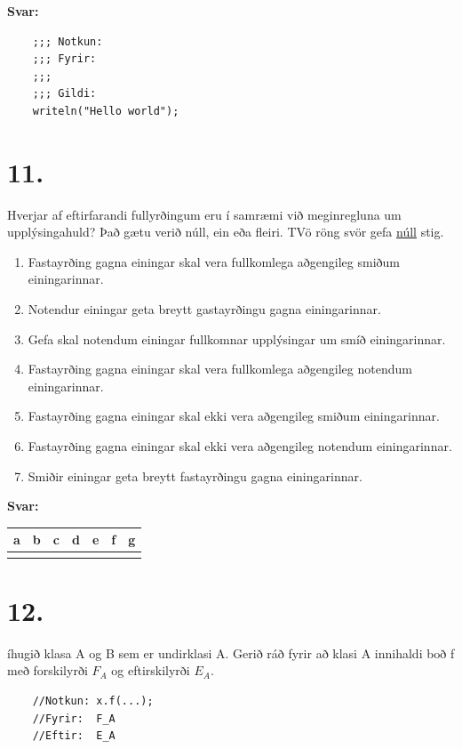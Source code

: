 \documentclass{article}
\newcommand{\sv}{\textbf{Svar:}}
\newcommand{\enum}{\begin{enumerate}[label = \alph*.]}
\begin{document}
     \sv





    \begin{lstlisting}
    ;;; Notkun:
    ;;; Fyrir:
    ;;;
    ;;; Gildi:
    writeln("Hello world");  
    \end{lstlisting}


    \newpage
    \section{11.}
    Hverjar af eftirfarandi fullyrðingum eru í samræmi við meginregluna um upplýsingahuld? 
    Það gætu verið núll, ein eða fleiri. TVö röng svör gefa \underline{núll} stig.

    \enum
    \item Fastayrðing gagna einingar skal vera fullkomlega aðgengileg smiðum einingarinnar.
    \item Notendur einingar geta breytt gastayrðingu gagna einingarinnar.
    \item Gefa skal notendum einingar fullkomnar upplýsingar um smíð einingarinnar.
    \item Fastayrðing gagna einingar skal vera fullkomlega aðgengileg notendum einingarinnar.
    \item Fastayrðing gagna einingar skal ekki vera aðgengileg smiðum einingarinnar.
    \item Fastayrðing gagna einingar skal ekki vera aðgengileg notendum einingarinnar.
    \item Smiðir einingar geta breytt fastayrðingu gagna einingarinnar.
\end{enumerate}


    \sv

    
\begin{tabularx}{\textwidth}{ |X|X|X|X|X|X|X|}
    \hline
    \textbf{a}  & \textbf{b}  & \textbf{c}  & \textbf{d}  & \textbf{e}  & \textbf{f}  & \textbf{g} \\ \hline
     & & & & & & \\ \hline
 \end{tabularx}


 \newpage

 \section{12.}

 íhugið klasa A og B sem er undirklasi A. Gerið ráð fyrir að klasi A innihaldi boð f með forskilyrði $F_A$ og eftirskilyrði $E_A$.
 \begin{verbatim}
    //Notkun: x.f(...);
    //Fyrir:  F_A
    //Eftir:  E_A
 \end{verbatim}
\end{document}
